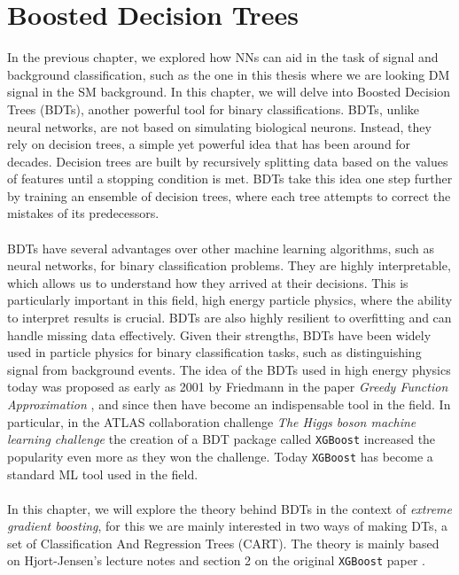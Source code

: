 \documentclass[12pt, a4paper]{book}
\begin{document}
\clearpage




\section{Boosted Decision Trees}
In the previous chapter, we explored how NNs can aid in the task of signal and background classification, such as the one in this thesis where we are looking DM signal in the SM background. In this chapter, we will delve into Boosted Decision Trees (BDTs), 
another powerful tool for binary classifications. BDTs, unlike neural networks, are not based on simulating biological neurons. Instead, they rely on decision trees, a simple yet powerful idea that has been around for decades. \cite{Morgan1963ProblemsIT, ID3_BDT} 
Decision trees are built by recursively splitting data based on the values of features until a stopping condition is met. BDTs take this idea one step further by training an ensemble of decision trees, where each tree attempts to correct the mistakes of its predecessors.\\
\\BDTs have several advantages over other machine learning algorithms, such as neural networks, for binary classification problems. They are highly interpretable, which allows us to understand how they arrived at their decisions. This is particularly important in this field, 
high energy particle physics, where the ability to interpret results is crucial. BDTs are also highly resilient to overfitting and can handle missing data effectively. Given their strengths, BDTs have been widely used in particle physics for binary classification tasks, 
such as distinguishing signal from background events. The idea of the BDTs used in high energy physics today was proposed as early as 2001 by Friedmann in the paper \textit{Greedy Function Approximation} \cite{BDT_Friedman}, and since then have become an indispensable tool in the field. 
In particular, in the ATLAS collaboration challenge \textit{The Higgs boson machine learning challenge} \cite{HiggsChallenge} the creation of a BDT package called \verb|XGBoost| \cite{XGBoost} increased the popularity even more as they won the challenge. 
Today \verb|XGBoost| has become a standard ML tool used in the field.\\
\\In this chapter, we will explore the theory behind BDTs in the context of \textit{extreme gradient boosting}, for this we are mainly interested in two ways of making DTs, a set of Classification And Regression Trees (CART). 
The theory is mainly based on Hjort-Jensen's lecture notes \cite{MORTYY4, MORTYY5} and section 2 on the original \verb|XGBoost| paper \cite{XGBoost}.
\newpage
\end{document}
